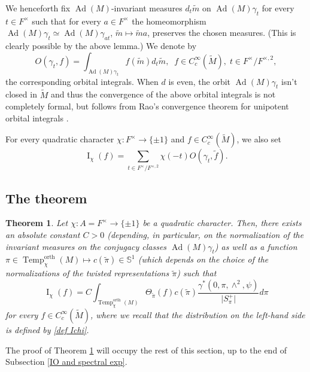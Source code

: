 \documentclass[12pt]{article}
\newtheorem{theo}{Theorem}[section]
\numberwithin{equation}{section}
\def\tM{\widetilde{M}}
\def\tm{\widetilde{m}}
\def\tf{\widetilde{f}}
\def\tpi{\widetilde{\pi}}
\DeclareMathOperator{\orth}{orth}
\DeclareMathOperator{\Temp}{Temp}
\DeclareMathOperator{\Ad}{Ad}
\DeclareMathOperator{\rI}{\mathrm{I}}
\begin{document}
	We henceforth fix $\Ad(M)$-invariant measures $d_t \tm$ on $\Ad(M)\gamma_t$ for every $t\in F^\times$ such that for every $a\in F^\times$ the homeomorphism $\Ad(M)\gamma_t\simeq \Ad(M) \gamma_{at}$, $\tm\mapsto \tm a$, preserves the chosen measures. (This is clearly possible by the above lemma.) We denote by
	$$\displaystyle O(\gamma_t,f)=\int_{\Ad(M)\gamma_t} f(\tm) d_t\tm,\;\; f\in C_c^\infty(\tM),\; t\in F^\times/F^{\times,2},$$
	the corresponding orbital integrals. When $d$ is even, the orbit $\Ad(M)\gamma_t$ isn't closed in $\tM$ and thus the convergence of the above orbital integrals is not completely formal, but follows from Rao's convergence theorem for unipotent orbital integrals \cite{Rao}.
	
	For every quadratic character $\chi: F^\times \to \{\pm 1 \}$ and $f\in C_c^\infty(\tM)$, we also set
	\begin{equation}\label{def Ichi}
		\displaystyle \rI_{\chi}(f)=\sum_{t\in F^\times/F^{\times,2}} \chi(-t) O(\gamma_t,\tf).
	\end{equation}
	
	
	
	\subsection{The theorem}
	
	
	
	\begin{theo}\label{theo spectraldec orbint}
		Let $\chi: A=F^\times\to \{\pm 1 \}$ be a quadratic character. Then, there exists an absolute constant $C>0$ (depending, in particular, on the normalization of the invariant measures on the conjugacy classes $\Ad(M)\gamma_t$) as well as a function $\pi\in\Temp^{\orth}_\chi(M)\mapsto c(\tpi)\in \mathbb{S}^1$ (which depends on the choice of the normalizations of the twisted representations $\tpi$) such that
		\begin{equation*}
			\displaystyle \rI_{\chi}(f)=C \int_{\Temp_\chi^{\orth}(M)} \Theta_{\tpi}(f) c(\tpi)\frac{\gamma^*(0,\pi,\wedge^2,\psi)}{\lvert S_\pi^{+}\rvert} d\pi
		\end{equation*}
		for every $f\in C_c^\infty(\tM)$, where we recall that the distribution on the left-hand side is defined by \eqref{def Ichi}.
	\end{theo}

The proof of Theorem \ref{theo spectraldec orbint} will occupy the rest of this section, up to the end of Subsection \ref{IO and spectral exp}.
	
\end{document}
